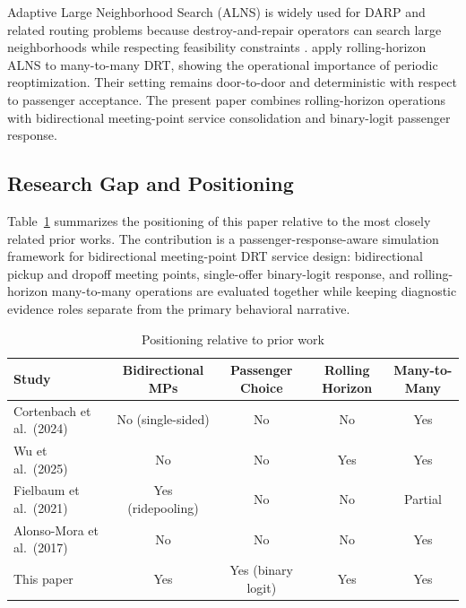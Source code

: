 Adaptive Large Neighborhood Search (ALNS) is widely used for DARP and related routing
problems because destroy-and-repair operators can search large neighborhoods while
respecting feasibility constraints \citep{ropke2006}. \citet{wu2025} apply rolling-horizon
ALNS to many-to-many DRT, showing the operational importance of periodic
reoptimization. Their setting remains door-to-door and deterministic with respect to
passenger acceptance. The present paper combines rolling-horizon operations with
bidirectional meeting-point service consolidation and binary-logit passenger response.

\subsection{Research Gap and Positioning}

Table~\ref{tab:literature-gap} summarizes the positioning of this paper relative to the
most closely related prior works. The contribution is a passenger-response-aware
simulation framework for bidirectional meeting-point DRT service design: bidirectional
pickup and dropoff meeting points, single-offer binary-logit response, and
rolling-horizon many-to-many operations are evaluated together while keeping diagnostic
evidence roles separate from the primary behavioral narrative.

\begin{table}[width=\textwidth,pos=t]
\centering
\caption{Positioning relative to prior work}
\label{tab:literature-gap}
\begin{tabular}{lcccc}
\toprule
Study & Bidirectional MPs & Passenger Choice & Rolling Horizon & Many-to-Many \\
\midrule
Cortenbach et al.\ (2024) & No (single-sided) & No & No & Yes \\
Wu et al.\ (2025)         & No                & No & Yes & Yes \\
Fielbaum et al.\ (2021)   & Yes (ridepooling) & No & No & Partial \\
Alonso-Mora et al.\ (2017) & No               & No & No & Yes \\
This paper                & Yes               & Yes (binary logit) & Yes & Yes \\
\bottomrule
\end{tabular}
\end{table}
